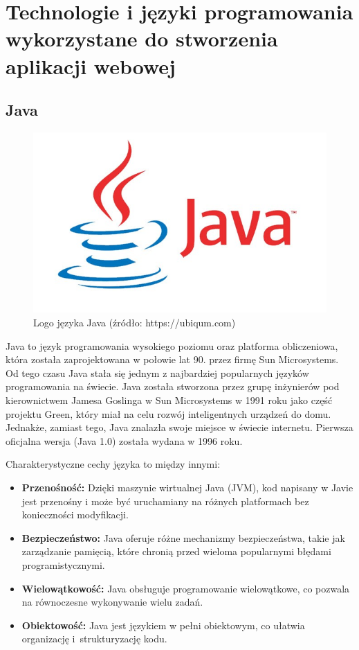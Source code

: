 \chapter{Technologie i języki programowania wykorzystane do stworzenia aplikacji webowej}

\section{Java}
\begin{figure}[h]
    \centering
    \includegraphics[width=0.7\linewidth]{./img/javalogo.jpg}
    \caption{Logo języka Java (źródło: https://ubiqum.com)}
    \label{fig:Java}
\end{figure}
Java to język programowania wysokiego poziomu oraz platforma obliczeniowa, która została zaprojektowana w połowie lat 90. przez firmę Sun Microsystems. Od tego czasu Java stała się jednym z najbardziej popularnych języków programowania na świecie. Java została stworzona przez grupę inżynierów pod kierownictwem Jamesa Goslinga w Sun Microsystems w 1991 roku jako część projektu Green, który miał na celu rozwój inteligentnych urządzeń do domu. Jednakże, zamiast tego, Java znalazła swoje miejsce w świecie internetu. Pierwsza oficjalna wersja (Java 1.0) została wydana w 1996 roku.

Charakterystyczne cechy języka to między innymi:
\begin{itemize}
\item \textbf{Przenośność:} Dzięki maszynie wirtualnej Java (JVM), kod napisany w Javie jest przenośny i może być uruchamiany na różnych platformach bez konieczności modyfikacji.
\item \textbf{Bezpieczeństwo:} Java oferuje różne mechanizmy bezpieczeństwa, takie jak zarządzanie pamięcią, które chronią przed wieloma popularnymi błędami programistycznymi.
\item \textbf{Wielowątkowość:} Java obsługuje programowanie wielowątkowe, co pozwala na równoczesne wykonywanie wielu zadań.
\item \textbf{Obiektowość:} Java jest językiem w pełni obiektowym, co ułatwia organizację i~strukturyzację kodu.
\end{itemize}

